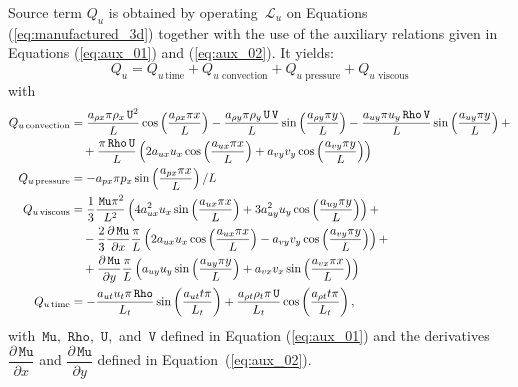 \documentclass[10pt]{article}
\newcommand{\diff}[2] {\dfrac{\partial #1}{\partial #2}}
\newcommand{\Rho}{\,\mathtt{Rho}}
\newcommand{\U}{\,\mathtt{U}}
\newcommand{\V}{\,\mathtt{V}}
\newcommand{\Lo}{\,\mathcal{L}}
\newcommand{\Mu}{\,\mathtt{Mu}}
\newcommand{\DMuDx}{\diff{\Mu}{x}}
\newcommand{\DMuDy}{\diff{\Mu}{y}}
\newcommand{\timee}{\,\text{time}}
\newcommand{\convection}{\,\text{convection}}
\newcommand{\viscous}{\,\text{viscous}}
\newcommand{\pressure}{\,\text{pressure}}
\begin{document}
Source term $Q_u$ is obtained by operating $\Lo_{u}$ on Equations  (\ref{eq:manufactured_3d}) together with the use of the  auxiliary relations given in Equations (\ref{eq:aux_01}) and (\ref{eq:aux_02}). It yields:
\begin{equation*}
Q_u = Q_{u \, \text{time}}+Q_{u \, \convection}+Q_{u \, \pressure }+Q_{u \, \viscous }
\end{equation*}
with
\begin{equation*}
\begin{split}
 Q_{u \convection} &= \dfrac{a_{\rho x} \pi \rho_x \U^2}{L} \cos\left(\dfrac{a_{\rho x} \pi x}{L}\right)-\dfrac{a_{\rho y} \pi \rho_y \U \V }{L}\sin\left(\dfrac{a_{\rho y} \pi y}{L}\right)-\dfrac{a_{uy} \pi u_y \Rho \V}{L} \sin\left(\dfrac{a_{uy} \pi y}{L}\right) +\\
	&\quad+\dfrac{\pi \Rho \U}{L}\left(2 a_{ux} u_x \cos\left(\dfrac{a_{ux} \pi x}{L}\right)+a_{vy} v_y \cos\left(\dfrac{a_{vy} \pi y}{L}\right)\right)  \\ \vspace{15pt}
%
Q_{u \pressure} &= -a_{px} \pi p_x \sin\left(\dfrac{a_{px} \pi x}{L}\right)/L \\ \vspace{15pt}
%
Q_{u \viscous} &= \dfrac{1}{3} \dfrac{ \Mu \pi^2}{L^2} \left(4 a_{ux}^2 u_x \sin\left(\dfrac{a_{ux} \pi x}{L}\right)+3 a_{uy}^2 u_y \cos\left(\dfrac{a_{uy} \pi y}{L}\right)\right)+\\
	&\quad-\dfrac{2}{3}\DMuDx \dfrac{\pi}{L} \left(2 a_{ux} u_x \cos\left(\dfrac{a_{ux} \pi x}{L}\right)-a_{vy} v_y \cos\left(\dfrac{a_{vy} \pi y}{L}\right)\right)  +\\
	&\quad+\DMuDy \dfrac{\pi}{L}\left(a_{uy} u_y \sin\left(\dfrac{a_{uy} \pi y}{L}\right)+a_{vx} v_x \sin\left(\dfrac{a_{vx} \pi x}{L}\right)\right)   \\ \vspace{15pt}
%
Q_{u \timee} &= -\dfrac{a_{ut} u_t \pi \Rho}{L_t}\sin\left(\dfrac{a_{ut} t \pi}{L_t}\right) +\dfrac{a_{\rho t} \rho_t \pi \U}{L_t}\cos\left(\dfrac{a_{\rho t} t \pi}{L_t}\right),
\end{split}
\end{equation*}
%
with $\Mu,\, \Rho,\,\U,$ and $\V$  defined in Equation (\ref{eq:aux_01}) and the derivatives $\DMuDx$ and $\DMuDy$  defined in Equation~(\ref{eq:aux_02}).



\end{document}
